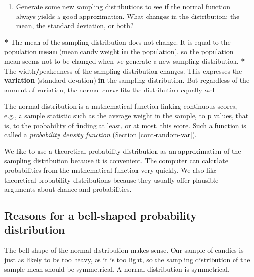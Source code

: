 \documentclass[a4paper]{book}
\newenvironment{Shaded}{\begin{snugshade}}{\end{snugshade}}
\newcommand{\KeywordTok}[1]{\textcolor[rgb]{0,0,0}{\textbf{#1}}}
\newcommand{\StringTok}[1]{\textcolor[rgb]{0.00,0.00,0.00}{#1}}
\newcommand{\ControlFlowTok}[1]{\textcolor[rgb]{0.00,0.00,0.00}{\textbf{#1}}}
\newcommand{\OperatorTok}[1]{\textcolor[rgb]{0.00,0.00,0.00}{\textbf{#1}}}
\newcommand{\NormalTok}[1]{#1}
\providecommand{\tightlist}{%
  \setlength{\itemsep}{0pt}\setlength{\parskip}{0pt}}
\theoremstyle{definition}
\theoremstyle{definition}
\theoremstyle{definition}
\theoremstyle{remark}
\begin{document}
\begin{enumerate}
\def\labelenumi{\arabic{enumi}.}
\setcounter{enumi}{2}
\tightlist
\item
  Generate some new sampling distributions to see if the normal function
  always yields a good approximation. What changes in the distribution:
  the mean, the standard deviation, or both?
\end{enumerate}

\begin{Shaded}
\begin{Highlighting}[]
\OperatorTok{*}\StringTok{ }\NormalTok{The mean of the sampling distribution does not change. It is equal to the}
\NormalTok{population }\KeywordTok{mean}\NormalTok{ (mean candy weight }\ControlFlowTok{in}\NormalTok{ the population), so the population mean}
\NormalTok{seems not to be changed when we generate a new sampling distribution.}
\OperatorTok{*}\StringTok{ }\NormalTok{The width}\OperatorTok{/}\NormalTok{peakedness of the sampling distribution changes. This expresses}
\NormalTok{the }\KeywordTok{variation}\NormalTok{ (standard devation) }\ControlFlowTok{in}\NormalTok{ the sampling distribution. But regardless}
\NormalTok{of the amount of variation, the normal curve fits the distribution equally}
\NormalTok{well.}
\end{Highlighting}
\end{Shaded}

The normal distribution is a mathematical function linking continuous
scores, e.g., a sample statistic such as the average weight in the
sample, to p values, that is, to the probability of finding at least, or
at most, this score. Such a function is called a \emph{probability
density function} (Section \ref{cont-random-var}).

We like to use a theoretical probability distribution as an
approximation of the sampling distribution because it is convenient. The
computer can calculate probabilities from the mathematical function very
quickly. We also like theoretical probability distributions because they
usually offer plausible arguments about chance and probabilities.

\subsection{Reasons for a bell-shaped probability
distribution}\label{reasons-for-a-bell-shaped-probability-distribution}

The bell shape of the normal distribution makes sense. Our sample of
candies is just as likely to be too heavy, as it is too light, so the
sampling distribution of the sample mean should be symmetrical. A normal
distribution is symmetrical.
\end{document}
